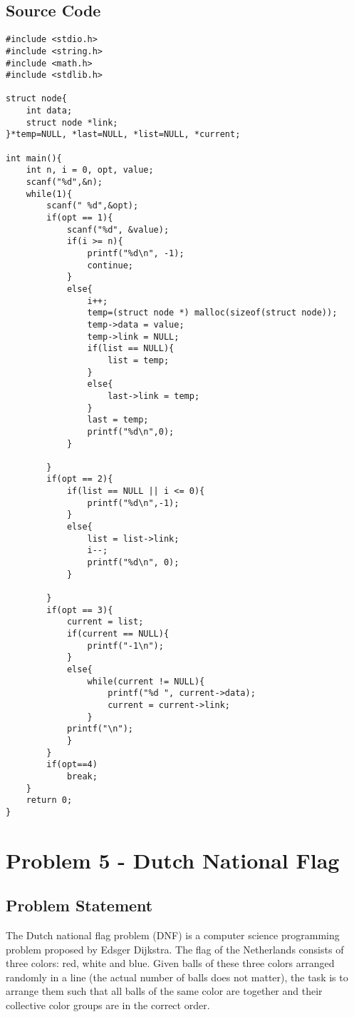 \documentclass{article}
\begin{document}
\subsection{Source Code}
\begin{verbatim}
#include <stdio.h>
#include <string.h>
#include <math.h>
#include <stdlib.h>

struct node{
    int data;
    struct node *link;
}*temp=NULL, *last=NULL, *list=NULL, *current;

int main(){
    int n, i = 0, opt, value;
    scanf("%d",&n);
    while(1){
        scanf(" %d",&opt);
        if(opt == 1){
            scanf("%d", &value);
            if(i >= n){
                printf("%d\n", -1);
                continue;
            }
            else{
                i++;
                temp=(struct node *) malloc(sizeof(struct node));
                temp->data = value;
                temp->link = NULL;
                if(list == NULL){
                    list = temp;
                }
                else{
                    last->link = temp;
                }
                last = temp;
                printf("%d\n",0);
            }

        }
        if(opt == 2){
            if(list == NULL || i <= 0){
                printf("%d\n",-1);
            }
            else{
                list = list->link;
                i--;
                printf("%d\n", 0);
            }

        }
        if(opt == 3){
            current = list;
            if(current == NULL){
                printf("-1\n");
            }
            else{
                while(current != NULL){
                    printf("%d ", current->data);
                    current = current->link;
                }
            printf("\n");
            }
        }
        if(opt==4)
            break;
    }
    return 0;
}

\end{verbatim}
\newpage
\section{Problem 5 - Dutch National Flag}
\subsection{Problem Statement}
The Dutch national flag problem (DNF) is a computer science programming problem proposed by Edsger Dijkstra. The flag of the Netherlands consists of three colors: red, white and blue. Given balls of these three colors arranged randomly in a line (the actual number of balls does not matter), the task is to arrange them such that all balls of the same color are together and their collective color groups are in the correct order.
\end{document}
